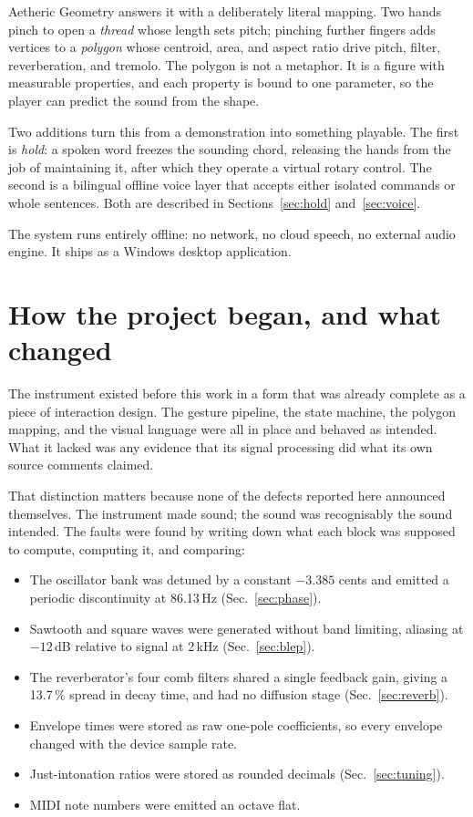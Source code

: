 \documentclass[a4paper,10pt,twocolumn]{article}
\begin{document}
Aetheric Geometry answers it with a deliberately literal mapping. Two hands
pinch to open a \emph{thread} whose length sets pitch; pinching further fingers
adds vertices to a \emph{polygon} whose centroid, area, and aspect ratio drive
pitch, filter, reverberation, and tremolo. The polygon is not a metaphor. It
is a figure with measurable properties, and each property is bound to one
parameter, so the player can predict the sound from the shape.

Two additions turn this from a demonstration into something playable. The first
is \emph{hold}: a spoken word freezes the sounding chord, releasing the hands
from the job of maintaining it, after which they operate a virtual rotary
control. The second is a bilingual offline voice layer that accepts either
isolated commands or whole sentences. Both are described in
Sections~\ref{sec:hold} and~\ref{sec:voice}.

The system runs entirely offline: no network, no cloud speech, no external
audio engine. It ships as a Windows desktop application.

\section{How the project began, and what changed}

The instrument existed before this work in a form that was already complete as
a piece of interaction design. The gesture pipeline, the state machine, the
polygon mapping, and the visual language were all in place and behaved as
intended. What it lacked was any evidence that its signal processing did what
its own source comments claimed.

That distinction matters because none of the defects reported here announced
themselves. The instrument made sound; the sound was recognisably the sound
intended. The faults were found by writing down what each block was supposed to
compute, computing it, and comparing:

\begin{itemize}\itemsep2pt
\item The oscillator bank was detuned by a constant $-3.385$ cents and emitted a
      periodic discontinuity at 86.13\,Hz (Sec.~\ref{sec:phase}).
\item Sawtooth and square waves were generated without band limiting, aliasing
      at $-12$\,dB relative to signal at 2\,kHz (Sec.~\ref{sec:blep}).
\item The reverberator's four comb filters shared a single feedback gain,
      giving a 13.7\,\% spread in decay time, and had no diffusion stage
      (Sec.~\ref{sec:reverb}).
\item Envelope times were stored as raw one-pole coefficients, so every
      envelope changed with the device sample rate.
\item Just-intonation ratios were stored as rounded decimals
      (Sec.~\ref{sec:tuning}).
\item MIDI note numbers were emitted an octave flat.
\end{itemize}
\end{document}

